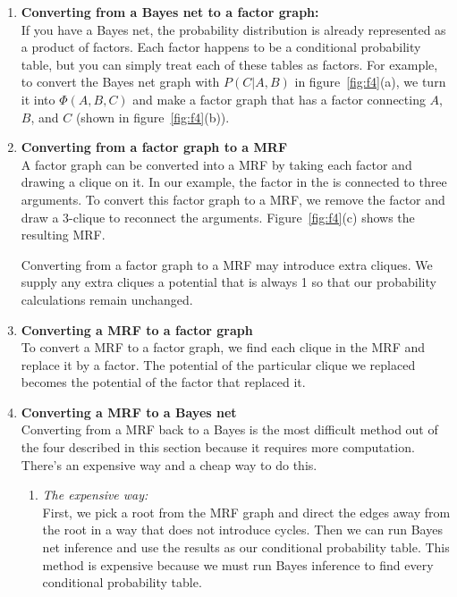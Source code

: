 \documentclass[twoside]{article}
\begin{document}
\begin{enumerate}
\item \textbf{Converting from a Bayes net to a factor graph:} \\
If you have a Bayes net, the probability distribution is already represented as a product of factors.
Each factor happens to be a conditional probability table, but you can simply treat each of these tables as factors.
For example, to convert the Bayes net graph with $P(C|A,B)$ in figure~\ref{fig:f4}(a), we turn it into $\Phi(A,B,C)$ and make
a factor graph that has a factor connecting $A$, $B$, and $C$ (shown in figure~\ref{fig:f4}(b)).

\item \textbf{Converting from a factor graph to a MRF} \\
A factor graph can be converted into a MRF by taking each factor and drawing a clique on it. 
In our example, the factor in the is connected to three arguments.
To convert this factor graph to a MRF, we remove the factor and draw a 3-clique to reconnect the arguments.
Figure~\ref{fig:f4}(c) shows the resulting MRF.

Converting from a factor graph to a MRF may introduce extra cliques.
We supply any extra cliques a potential that is always 1 so that our probability calculations remain unchanged.

\item \textbf{Converting a MRF to a factor graph} \\
To convert a MRF to a factor graph, we find each clique in the MRF and replace it by a factor.
The potential of the particular clique we replaced becomes the potential of the factor that replaced it.

\item \textbf{Converting a MRF to a Bayes net} \\
Converting from a MRF back to a Bayes is the most difficult method out of the four described in this section
because it requires more computation.
There's an expensive way and a cheap way to do this.

\begin{enumerate}
\item \textit{The expensive way:} \\
First, we pick a root from the MRF graph and direct the edges away from the root in a way that does not introduce cycles.
Then we can run Bayes net inference and use the results as our conditional probability table.
This method is expensive because we must run Bayes inference to find every conditional probability table.


\end{enumerate}
\end{enumerate}
\end{document}
